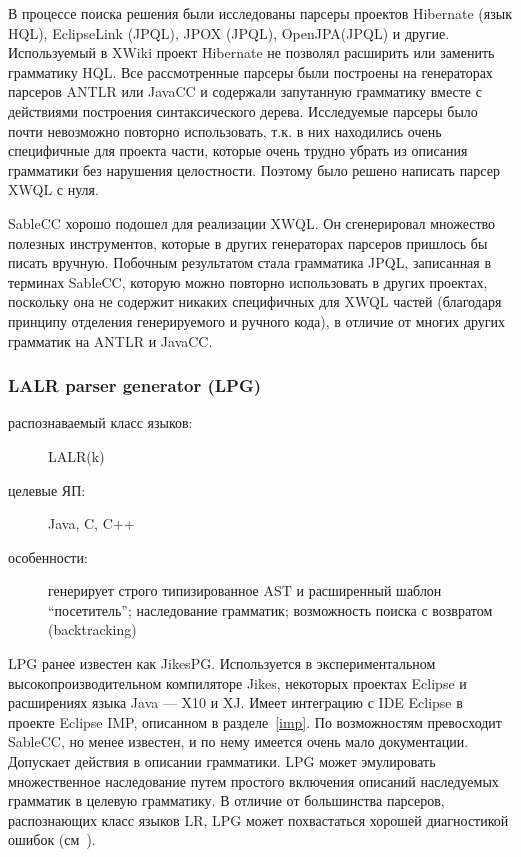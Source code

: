 \documentclass[a4paper,12pt,titlepage]{extarticle}
\begin{document}
В процессе поиска решения были исследованы парсеры проектов Hibernate (язык
HQL), EclipseLink (JPQL), JPOX (JPQL), OpenJPA(JPQL) и другие.
Используемый в XWiki проект Hibernate не позволял расширить или заменить
грамматику HQL.
Все рассмотренные парсеры были построены на генераторах парсеров ANTLR или
JavaCC и содержали запутанную грамматику вместе с действиями построения
синтаксического дерева.
Исследуемые парсеры было почти невозможно повторно использовать, т.к. в
них находились очень специфичные для проекта части, которые очень трудно убрать
из описания грамматики без нарушения целостности. Поэтому было решено написать
парсер XWQL с нуля.

SableCC хорошо подошел для реализации XWQL. Он сгенерировал множество полезных инструментов,
которые в других генераторах парсеров пришлось бы писать вручную. Побочным
результатом стала грамматика JPQL, записанная в терминах SableCC, которую можно
повторно использовать в других проектах, поскольку она не содержит никаких
специфичных для XWQL частей (благодаря принципу отделения генерируемого и
ручного кода), в отличие от многих других грамматик на ANTLR и JavaCC.

\subsubsection*{LALR parser generator (LPG)}
\begin{description}
  \item[распознаваемый класс языков:] LALR(k)
  \item[целевые ЯП:] Java, C, C++
  \item[особенности:] генерирует строго типизированное AST и расширенный
 	шаблон ``посетитель''; наследование грамматик; возможность поиска с возвратом
 	(backtracking)
\end{description}

LPG ранее известен как JikesPG. Используется в экспериментальном
высокопроизводительном компиляторе Jikes, некоторых проектах
Eclipse и расширениях языка Java --- X10 и XJ. Имеет интеграцию с IDE Eclipse в
проекте Eclipse IMP, описанном в разделе~\ref{imp}. По возможностям превосходит
SableCC, но менее известен, и по нему имеется очень мало документации.
Допускает действия в описании грамматики. LPG может эмулировать множественное
наследование путем простого включения описаний наследуемых грамматик в целевую
грамматику. В отличие от большинства парсеров, распознающих класс языков LR,
LPG может похвастаться хорошей диагностикой ошибок (см~\cite{lpgerr}).
\end{document}
